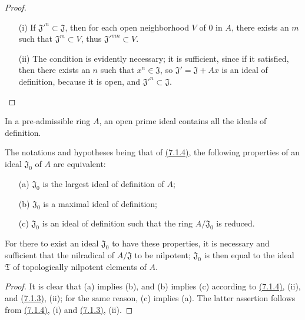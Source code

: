 \begin{proof}
\label{proof-prop-0.7.1.4}
\medskip\noindent
\begin{itemize}
  \item[(i)] If ${\mathfrak{J}'}^n\subset\mathfrak{J}$, then for each open neighborhood
    $V$ of $0$ in $A$, there exists an $m$ such that $\mathfrak{J}^m\subset V$, thus
    ${\mathfrak{J}'}^{mn}\subset V$.
  \item[(ii)] The condition is evidently necessary; it is sufficient, since if it
    satisfied, then there exists an $n$ such that $x^n\in\mathfrak{J}$, so
    $\mathfrak{J}'=\mathfrak{J}+Ax$ is an ideal of definition, because it is
    open, and ${\mathfrak{J}'}^n\subset\mathfrak{J}$.
\end{itemize}
\end{proof}

\begin{cor}[7.1.5]
\label{cor-0.7.1.5}
In a pre-admissible ring $A$, an open prime ideal contains all the ideals of definition.
\end{cor}

\begin{cor}[7.1.6]
\label{cor-0.7.1.6}
The notations and hypotheses being that of \hyperref[prop-0.7.1.4]{(7.1.4)}, the following
properties of an ideal $\mathfrak{J}_0$ of $A$ are equivalent:
\begin{itemize}
  \item[{\rm(a)}] $\mathfrak{J}_0$ is the largest ideal of definition of $A$;
  \item[{\rm(b)}] $\mathfrak{J}_0$ is a maximal ideal of definition;
  \item[{\rm(c)}] $\mathfrak{J}_0$ is an ideal of definition such that the ring $A/\mathfrak{J}_0$
    is reduced.
\end{itemize}
For there to exist an ideal $\mathfrak{J}_0$ to have these properties, it is
necessary and sufficient that the nilradical of $A/\mathfrak{J}$ to be
nilpotent; $\mathfrak{J}_0$ is then equal to the ideal $\mathfrak{T}$ of
topologically nilpotent elements of $A$.
\end{cor}

\begin{proof}
\label{proof-cor-0.7.1.6}
It is clear that (a) implies (b), and (b) implies (c) according to
\hyperref[prop-0.7.1.4]{(7.1.4)}, (ii), and \hyperref[lem-0.7.1.3]{(7.1.3)}, (ii); for the same
reason, (c) implies (a). The latter assertion follows from \hyperref[prop-0.7.1.4]{(7.1.4)}, (i) and
\hyperref[lem-0.7.1.3]{(7.1.3)}, (ii).
\end{proof}

